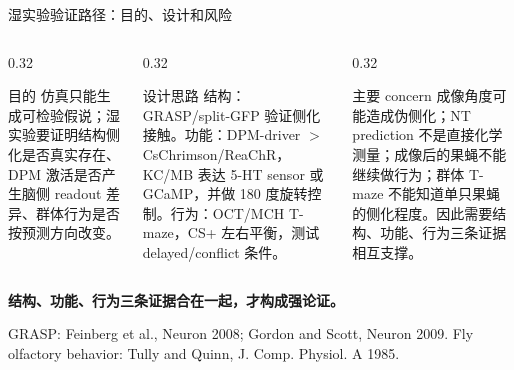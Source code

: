 \documentclass[aspectratio=169,10pt,fontset=none]{ctexbeamer}
\newcommand{\blue}[1]{\textcolor{FlyBlue}{\textbf{#1}}}
\newcommand{\refs}[1]{\vfill{\tiny\textcolor{FlyDark}{#1}}}
\begin{document}
\begin{frame}{湿实验验证路径：目的、设计和风险}
\small
\begin{columns}[T,onlytextwidth]
  \begin{column}{0.32\textwidth}
    \begin{block}{目的}
      仿真只能生成可检验假说；湿实验要证明结构侧化是否真实存在、DPM 激活是否产生脑侧 readout 差异、群体行为是否按预测方向改变。
    \end{block}
  \end{column}
  \begin{column}{0.32\textwidth}
    \begin{block}{设计思路}
      结构：GRASP/split-GFP 验证侧化接触。功能：DPM-driver $>$ CsChrimson/ReaChR，KC/MB 表达 5-HT sensor 或 GCaMP，并做 180 度旋转控制。行为：OCT/MCH T-maze，CS+ 左右平衡，测试 delayed/conflict 条件。
    \end{block}
  \end{column}
  \begin{column}{0.32\textwidth}
    \begin{block}{主要 concern}
      成像角度可能造成伪侧化；NT prediction 不是直接化学测量；成像后的果蝇不能继续做行为；群体 T-maze 不能知道单只果蝇的侧化程度。因此需要结构、功能、行为三条证据相互支撑。
    \end{block}
  \end{column}
\end{columns}
\vspace{0.35em}
\begin{center}
\blue{结构、功能、行为三条证据合在一起，才构成强论证。}
\end{center}
\refs{GRASP: Feinberg et al., Neuron 2008; Gordon and Scott, Neuron 2009. Fly olfactory behavior: Tully and Quinn, J. Comp. Physiol. A 1985.}
\end{frame}
\end{document}
